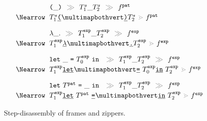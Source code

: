 \begin{figure}
  \newcommand{\vstretch}{\vspace{0.3cm}}
  \[
    \arraycolsep=3pt
    \def\arraystretch{1.2}
    \begin{array}{rl}
      & \tframelit{
        \sparen{\_}
      }{
        \tframelit{\tiles^s_1\_\tiles^s_2}{\tfrelem^{\pat}}
      } \\
      \tframedu
      & \zipper{
        \pointing{\tiles^s_1\shardlit{\texttt{(}}~}{~\shardlit{\texttt{)}}\tiles^s_2}
      }{
        \tfrelem^{\pat}
      } \vstretch \\

      & \tframelit{
        \slam{\_}{}
      }{
        \tframelit{\tiles^{\expr}_1\_\tiles^{\expr}_2}{\tfrelem^{\expr}}
      } \\
      \tframedu
      & \zipper{
        \pointing{\tiles^{\expr}_1\shardlit{$\lambda$}~}{~\shardlit{\texttt{.}}\tiles^{\expr}_2}
      }{
        \tfrelem^{\expr}
      } \vstretch \\

      & \tframelit{
        \slet{\_}{\tiles^{\expr}_0}{}
      }{
        \tframelit{\tiles^{\expr}_1\_\tiles^{\expr}_2}{\tfrelem^{\expr}}
      } \\
      \tframedu
      & \zipper{
        \pointing{
          \tiles^{\expr}_1\shardlit{\texttt{let}}~
        }{
          ~\shardlit{\texttt{=}}~\tiles^{\expr}_0\shardlit{\texttt{in}}~\tiles^{\expr}_2
        }
      }{
        \tfrelem^{\expr}
      } \vstretch \\

      & \tframelit{
        \slet{\tiles^{\pat}}{\_}{}
      }{
        \tframelit{\tiles^{\expr}_1\_\tiles^{\expr}_2}{\tfrelem^{\expr}}
      } \\
      \tframedu
      & \zipper{
        \pointing{
          \tiles^{\expr}_1\shardlit{\texttt{let}}~\tiles^{\pat}~\shardlit{\texttt{=}}~
        }{
          ~\shardlit{\texttt{in}}~\tiles^{\expr}_2
        }
      }{
        \tfrelem^{\expr}
      }
  \end{array}\]
  \vspace{0.1cm}

  \begin{mathpar}
  \end{mathpar}
  \caption{
    Step-disassembly of frames and zippers.
  }
  \label{fig:frame-disassembly}
\end{figure}